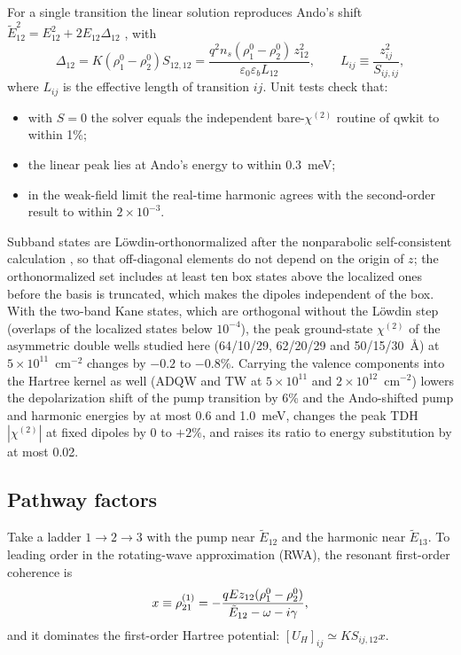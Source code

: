 \documentclass[11pt]{article}
\newcommand{\chitwo}{\chi^{(2)}}
\newcommand{\Et}{\tilde E}
\let\hbar\relax\DeclareRobustCommand{\hbar}{{\mathchar'26\mkern-9mu h}}
\begin{document}
For a single transition the linear solution reproduces Ando's shift $\Et_{12}^2=E_{12}^2+2E_{12}\Delta_{12}$ \cite{Ando1982}, with
\begin{equation}
\Delta_{12}=K(\rho^0_1-\rho^0_2)S_{12,12}=\frac{q^2n_s(\rho^0_1-\rho^0_2)\,z_{12}^2}{\varepsilon_0\varepsilon_b L_{12}},\qquad L_{ij}\equiv\frac{z_{ij}^2}{S_{ij,ij}},\label{eq:Delta}
\end{equation}
where $L_{ij}$ is the effective length of transition $ij$. Unit tests check that:
\begin{itemize}
\item with $S=0$ the solver equals the independent bare-$\chitwo$ routine of qwkit to within 1\%;
\item the linear peak lies at Ando's energy to within 0.3~meV;
\item in the weak-field limit the real-time harmonic agrees with the second-order result to within $2\times10^{-3}$.
\end{itemize}
Subband states are Löwdin-orthonormalized after the nonparabolic self-consistent calculation \cite{Lowdin1950}, so that off-diagonal elements do not depend on the origin of $z$; the orthonormalized set includes at least ten box states above the localized ones before the basis is truncated, which makes the dipoles independent of the box. With the two-band Kane states, which are orthogonal without the Löwdin step (overlaps of the localized states below $10^{-4}$), the peak ground-state $\chitwo$ of the asymmetric double wells studied here (64/10/29, 62/20/29 and 50/15/30~\AA) at $5\times10^{11}$~cm$^{-2}$ changes by $-0.2$ to $-0.8\%$. Carrying the valence components into the Hartree kernel as well (ADQW and TW at $5\times10^{11}$ and $2\times10^{12}$~cm$^{-2}$) lowers the depolarization shift of the pump transition by 6\% and the Ando-shifted pump and harmonic energies by at most 0.6 and 1.0~meV, changes the peak TDH $|\chitwo|$ at fixed dipoles by 0 to $+2\%$, and raises its ratio to energy substitution by at most 0.02.

\subsection{Pathway factors}\label{sec:pathway}
Take a ladder $1\to2\to3$ with the pump near $\Et_{12}$ and the harmonic near $\Et_{13}$. To leading order in the rotating-wave approximation (RWA), the resonant first-order coherence is
\begin{equation}
x\equiv\rho^{(1)}_{21}=-\frac{qEz_{12}(\rho^0_1-\rho^0_2)}{\Et_{12}-\hbar\omega-i\gamma},
\end{equation}
and it dominates the first-order Hartree potential: $[U_H]_{ij}\simeq KS_{ij,12}x$.
\end{document}
